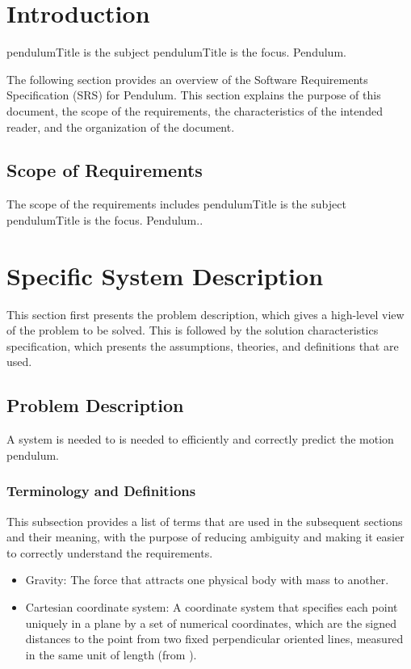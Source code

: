\documentclass[12pt]{article}
\begin{document}
\section{Introduction}
\label{Sec:Intro}
pendulumTitle is the subject pendulumTitle is the focus. Pendulum.

The following section provides an overview of the Software Requirements Specification (SRS) for Pendulum. This section explains the purpose of this document, the scope of the requirements, the characteristics of the intended reader, and the organization of the document.

\subsection{Scope of Requirements}
\label{Sec:ReqsScope}
The scope of the requirements includes pendulumTitle is the subject pendulumTitle is the focus. Pendulum..

\section{Specific System Description}
\label{Sec:SpecSystDesc}
This section first presents the problem description, which gives a high-level view of the problem to be solved. This is followed by the solution characteristics specification, which presents the assumptions, theories, and definitions that are used.

\subsection{Problem Description}
\label{Sec:ProbDesc}
A system is needed to is needed to efficiently and correctly predict the motion pendulum.

\subsubsection{Terminology and Definitions}
\label{Sec:TermDefs}
This subsection provides a list of terms that are used in the subsequent sections and their meaning, with the purpose of reducing ambiguity and making it easier to correctly understand the requirements.

\begin{itemize}
\item{Gravity: The force that attracts one physical body with mass to another.}
\item{Cartesian coordinate system: A coordinate system that specifies each point uniquely in a plane by a set of numerical coordinates, which are the signed distances to the point from two fixed perpendicular oriented lines, measured in the same unit of length (from \cite{cartesianWiki}).}
\end{itemize}
\end{document}
